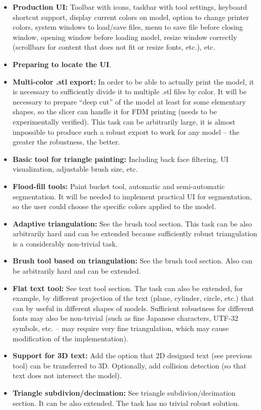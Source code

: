 \begin{itemize}
\item \textbf{Production UI:} Toolbar with icons, taskbar with tool settings, keyboard shortcut support, display current colors on model, option to change printer colors, system windows to load/save files, menu to save file before closing window, opening window before loading model, resize window correctly (scrollbars for content that does not fit or resize fonts, etc.), etc.
\item \textbf{Preparing to locate the UI}.
\item \textbf{Multi-color .stl export:} In order to be able to actually print the model, it is necessary to sufficiently divide it to multiple .stl files by color. It will be necessary to prepare ``deep cut'' of the model at least for some elementary shapes, so the slicer can handle it for FDM printing (needs to be experimentally verified).  This task can be arbitrarily large, it is almost impossible to produce such a robust export to work for any model -- the greater the robustness, the better.
\item \textbf{Basic tool for triangle painting:} Including back face filtering, UI visualization, adjustable brush size, etc.
\item \textbf{Flood-fill tools:} Paint bucket tool, automatic and semi-automatic segmentation. It will be needed to implement practical UI for segmentation, so the user could choose the specific colors applied to the model.
\item \textbf{Adaptive triangulation:} See the brush tool section.  This task can be also arbitrarily hard and can be extended because sufficiently robust triangulation is a considerably non-trivial task.
\item \textbf{Brush tool based on triangulation:} See the brush tool section. Also can be arbitrarily hard and can be extended.
\item \textbf{Flat text tool:} See text tool section. The task can also be extended, for example, by different projection of the text (plane, cylinder, circle, etc.) that can by useful in different shapes of models.  Sufficient robustness for different fonts may also be non-trivial (such as fine Japanese characters, UTF-32 symbols, etc. -- may require very fine triangulation, which may cause modification of the implementation).
\item \textbf{Support for 3D text:} Add the option that 2D designed text (see previous tool) can be transferred to 3D. Optionally, add collision detection (so that text does not intersect the model).
\item \textbf{Triangle subdivion/decimation:} See triangle subdivion/decimation section. It can be also extended. The task has no trivial robust solution.
\end{itemize}



